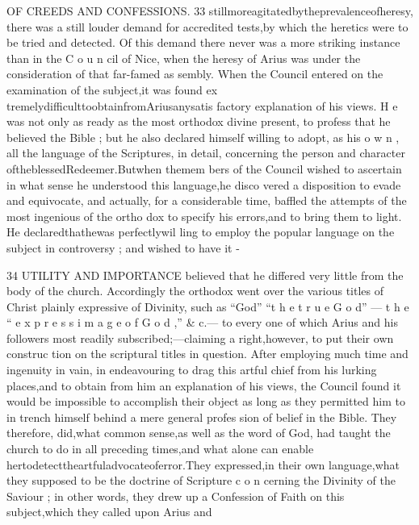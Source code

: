 \documentclass[
]{book}
\begin{document}
OF CREEDS AND CONFESSIONS. 33
stillmoreagitatedbytheprevalenceofheresy, there was a still louder demand for accredited
tests,by which the heretics were to be tried and detected. Of this demand there never
was a more striking instance than in the C o u n
cil of Nice, when the heresy of Arius was under the consideration of that far-famed as
sembly. When the Council entered on the examination of the subject,it was found ex
tremelydifficulttoobtainfromAriusanysatis
factory explanation of his views. H e was not only as ready as the most orthodox divine
present, to profess that he believed the Bible ; but he also declared himself willing to adopt,
as his o w n , all the language of the Scriptures, in detail, concerning the person and character oftheblessedRedeemer.Butwhen themem bers of the Council wished to ascertain in what
sense he understood this language,he disco vered a disposition to evade and equivocate, and actually, for a considerable time, baffled
the attempts of the most ingenious of the ortho dox to specify his errors,and to bring them to light. He declaredthathewas perfectlywil
ling to employ the popular language on the subject in controversy ; and wished to have it
-

34 UTILITY AND IMPORTANCE
believed that he differed very little from the body of the church. Accordingly the orthodox went over the various titles of Christ plainly expressive of Divinity, such as ``God''
``t h e t r u e G o d'' --- t h e `` e x p r e s s i m a g e o f G o d ,'' \& c.--- to every one of which Arius and his followers most readily subscribed;---claiming a right,however, to put their own construc tion on the scriptural titles in question. After employing much time and ingenuity in vain, in endeavouring to drag this artful chief from his lurking places,and to obtain from him an explanation of his views, the Council found it would be impossible to accomplish their object as long as they permitted him to in trench himself behind a mere general profes
sion of belief in the Bible. They therefore, did,what common sense,as well as the word of God, had taught the church to do in all preceding times,and what alone can enable hertodetecttheartfuladvocateoferror.They expressed,in their own language,what they supposed to be the doctrine of Scripture c o n cerning the Divinity of the Saviour ; in other words, they drew up a Confession of Faith on this subject,which they called upon Arius and
\end{document}
